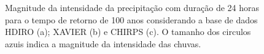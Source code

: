 \documentclass[
]{agujournal2019}
\begin{document}
\begin{figure}
\begin{minipage}{\linewidth}
{}


\end{minipage}%
\newline
\begin{minipage}{\linewidth}



\end{minipage}%

\caption{\label{fig-Figura6}Magnitude da intensidade da precipitação com
duração de 24 horas para o tempo de retorno de 100 anos considerando a
base de dados HDIRO (a); XAVIER (b) e CHIRPS (c). O tamanho dos circulos
azuis indica a magnitude da intensidade das chuvas.}

\end{figure}%
\end{document}
